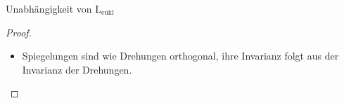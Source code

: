 \begin{lemma}{Unabhängigkeit von $ \text{L}_\text{eukl} $}
\begin{proof}
\begin{enumerate}
\begin{itemize}
\begin{align*}
          D_\theta \circ c(t) &= \begin{pmatrix}
            \cos\theta & -\sin\theta \\
            \sin\theta & \cos\theta
          \end{pmatrix}c(t) \\ 
           &= (\cos\theta x(t) - \sin\theta y(t), \sin\theta x(t) + \cos\theta y(t))
        \end{align*}
        die um Winkel $ \theta $ gedrehte Kurve. \\
        Da $ D_\theta $ eine orthogonale Abbildung ist, folgt
        \begin{equation*}
          (D_\theta \circ c(t))' = D_\theta * c'(t)
        \end{equation*}
        und damit
        \begin{equation*}
          \left\Vert (D_\theta \circ c(t))' \right\Vert = \left\Vert D_\theta * c' \right\Vert \overset{\text{orth.}}{=} \left\Vert c' \right\Vert
        \end{equation*}
        und damit gilt das Lemma für Drehungen. \qed
        \item Spiegelungen sind wie Drehungen orthogonal, ihre Invarianz folgt aus der Invarianz der Drehungen.
      \end{itemize}
    \end{enumerate}
  \end{proof}
\end{lemma}

